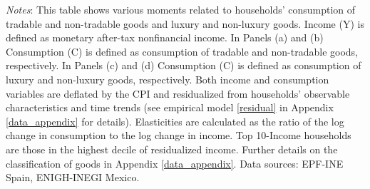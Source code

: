 \documentclass[12pt]{article}
\begin{document}
\begin{spacing}{1.5}
\begin{table}[H]
\begin{centering}
\par\end{centering}
\medskip{}

\raggedright{}\textit{\footnotesize{}Notes}{\footnotesize{}:
This table shows various moments related to households' consumption of tradable and non-tradable goods and luxury and non-luxury goods. Income (Y) is defined as monetary after-tax nonfinancial income. In Panels (a) and (b) Consumption (C) is defined as consumption of tradable and non-tradable goods, respectively. In Panels (c) and (d) Consumption (C) is defined as consumption of luxury and non-luxury goods, respectively. Both income and consumption variables are deflated by the CPI and residualized from households' observable characteristics and time trends (see empirical model \eqref{residual} in Appendix \ref{data_appendix} for details). Elasticities are calculated as the ratio of the log change in consumption to the log change in income. Top 10-Income households are those in the highest decile of residualized income. Further details on the classification of goods in Appendix \ref{data_appendix}. Data sources: EPF-INE Spain, ENIGH-INEGI Mexico.}{\footnotesize\par}
\end{table}




\begin{table}[H]
\begin{centering}
\caption{Consumption-Income Elasticities Adjusted by Inflation Heterogeneity
{\label{tab_rel_prices}}}
\vspace*{-0.2em}
  \\


\end{centering}
\end{table}
\end{spacing}
\end{document}
